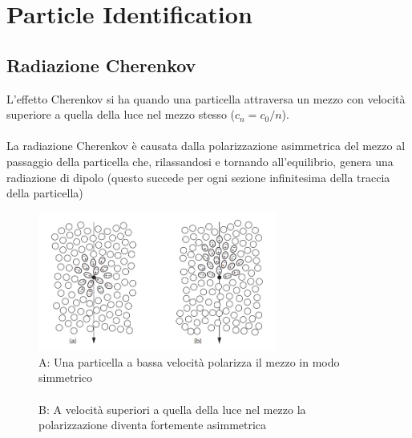 \chapter{Particle Identification}
\section{Radiazione Cherenkov}
L'effetto Cherenkov si ha quando una particella attraversa un mezzo con velocità superiore a quella della luce nel mezzo stesso ($c_n=c_0/n$).
\\ \\ 
La radiazione Cherenkov è causata dalla polarizzazione asimmetrica del mezzo al passaggio della particella che, rilassandosi e tornando all'equilibrio, genera una radiazione di dipolo (questo succede per ogni sezione infinitesima della traccia della particella)

\begin{figure}[H]
    \centering
    \includegraphics[width=0.7\textwidth,frame]{Chapters/images/Particle_identification/image-20220316192558631.png}
    \captionsetup{width=0.7\textwidth}
    \caption{A: Una particella a bassa velocità polarizza il mezzo in modo simmetrico\\ \\ B: A velocità superiori a quella della luce nel mezzo la polarizzazione diventa fortemente asimmetrica}
    \label{fig:}
\end{figure}

